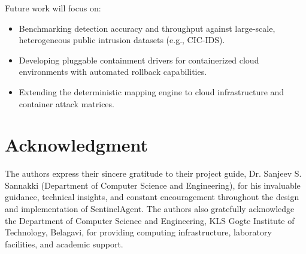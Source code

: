 \documentclass[conference]{IEEEtran}
\begin{document}
Future work will focus on:
\begin{itemize}
    \item Benchmarking detection accuracy and throughput against large-scale, heterogeneous public intrusion datasets (e.g., CIC-IDS).
    \item Developing pluggable containment drivers for containerized cloud environments with automated rollback capabilities.
    \item Extending the deterministic mapping engine to cloud infrastructure and container attack matrices.
\end{itemize}

\section*{Acknowledgment}
The authors express their sincere gratitude to their project guide, Dr. Sanjeev S. Sannakki (Department of Computer Science and Engineering), for his invaluable guidance, technical insights, and constant encouragement throughout the design and implementation of SentinelAgent. The authors also gratefully acknowledge the Department of Computer Science and Engineering, KLS Gogte Institute of Technology, Belagavi, for providing computing infrastructure, laboratory facilities, and academic support.



\end{document}
